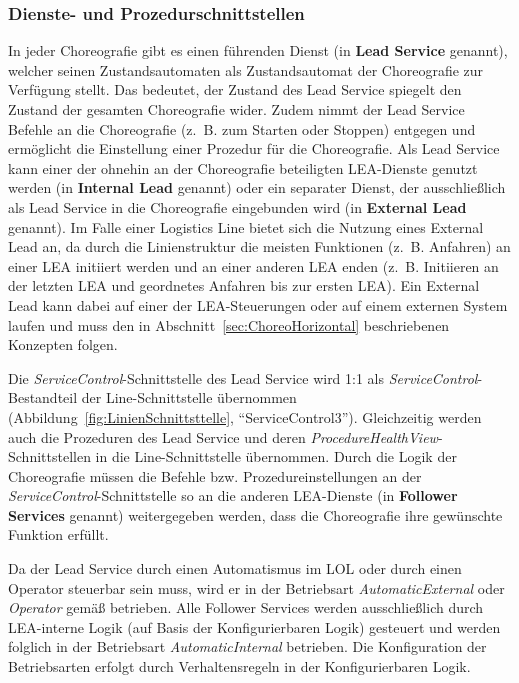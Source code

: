 \subsubsection{Dienste- und Prozedurschnittstellen}

In jeder Choreografie gibt es einen führenden Dienst (in \cite{Stutz.2026} \textbf{Lead Service} genannt), welcher seinen Zustandsautomaten als Zustandsautomat der Choreografie zur Verfügung stellt. Das bedeutet, der Zustand des Lead Service spiegelt den Zustand der gesamten Choreografie wider. Zudem nimmt der Lead Service Befehle an die Choreografie (z.~B. zum Starten oder Stoppen) entgegen und ermöglicht die Einstellung einer Prozedur für die Choreografie. Als Lead Service kann einer der ohnehin an der Choreografie beteiligten LEA-Dienste genutzt werden (in \cite{Stutz.2026} \textbf{Internal Lead} genannt) oder ein separater Dienst, der ausschließlich als Lead Service in die Choreografie eingebunden wird (in \cite{Stutz.2026} \textbf{External Lead} genannt). Im Falle einer Logistics Line bietet sich die Nutzung eines External Lead an, da durch die Linienstruktur die meisten Funktionen (z.~B. Anfahren) an einer LEA initiiert werden und an einer anderen LEA enden (z.~B. Initiieren an der letzten LEA und geordnetes Anfahren bis zur ersten LEA). Ein External Lead kann dabei auf einer der LEA-Steuerungen oder auf einem externen System laufen und muss den in Abschnitt~\ref{sec:ChoreoHorizontal} beschriebenen Konzepten folgen.

Die \emph{ServiceControl}-Schnittstelle des Lead Service wird 1:1 als \emph{ServiceControl}-Bestandteil der Line-Schnittstelle übernommen (Abbildung~\ref{fig:LinienSchnittsttelle}, \enquote{ServiceControl3}). Gleichzeitig werden auch die Prozeduren des Lead Service und deren \emph{ProcedureHealthView}-Schnittstellen in die Line-Schnittstelle übernommen. Durch die Logik der Choreografie müssen die Befehle bzw. Prozedureinstellungen an der \emph{ServiceControl}-Schnittstelle so an die anderen LEA-Dienste (in \cite{Stutz.2026} \textbf{Follower Services} genannt) weitergegeben werden, dass die Choreografie ihre gewünschte Funktion erfüllt. 

Da der Lead Service durch einen Automatismus im LOL oder durch einen Operator steuerbar sein muss, wird er in der Betriebsart \emph{AutomaticExternal} oder \emph{Operator} gemäß \cite{PNO.2025.Part4} betrieben. Alle Follower Services werden ausschließlich durch LEA-interne Logik (auf Basis der Konfigurierbaren Logik) gesteuert und werden folglich in der Betriebsart \emph{AutomaticInternal} betrieben. Die Konfiguration der Betriebsarten erfolgt durch Verhaltensregeln in der Konfigurierbaren Logik.

